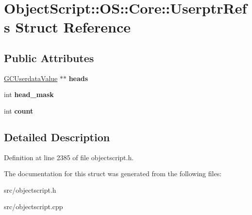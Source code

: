 \hypertarget{struct_object_script_1_1_o_s_1_1_core_1_1_userptr_refs}{}\section{Object\+Script\+:\+:OS\+:\+:Core\+:\+:Userptr\+Refs Struct Reference}
\label{struct_object_script_1_1_o_s_1_1_core_1_1_userptr_refs}
\subsection*{Public Attributes}
\begin{DoxyCompactItemize}
\item 
\hyperlink{struct_object_script_1_1_o_s_1_1_core_1_1_g_c_userdata_value}{G\+C\+Userdata\+Value} $\ast$$\ast$ {\bfseries heads}\hypertarget{struct_object_script_1_1_o_s_1_1_core_1_1_userptr_refs_a1769e3eae4b83c32f21ba3f3fe52dc78}{}\label{struct_object_script_1_1_o_s_1_1_core_1_1_userptr_refs_a1769e3eae4b83c32f21ba3f3fe52dc78}

\item 
int {\bfseries head\+\_\+mask}\hypertarget{struct_object_script_1_1_o_s_1_1_core_1_1_userptr_refs_ac4602229d0435655db9a582c74f83dcf}{}\label{struct_object_script_1_1_o_s_1_1_core_1_1_userptr_refs_ac4602229d0435655db9a582c74f83dcf}

\item 
int {\bfseries count}\hypertarget{struct_object_script_1_1_o_s_1_1_core_1_1_userptr_refs_a3d9758c08d13eb2abdbc9b95e9fddfbf}{}\label{struct_object_script_1_1_o_s_1_1_core_1_1_userptr_refs_a3d9758c08d13eb2abdbc9b95e9fddfbf}

\end{DoxyCompactItemize}


\subsection{Detailed Description}


Definition at line 2385 of file objectscript.\+h.



The documentation for this struct was generated from the following files\+:\begin{DoxyCompactItemize}
\item 
src/objectscript.\+h\item 
src/objectscript.\+cpp\end{DoxyCompactItemize}
